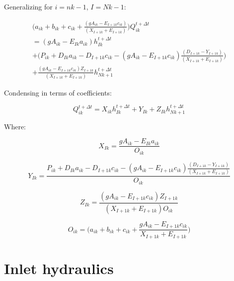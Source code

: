 \documentclass[11pt]{article}
\begin{document}
Generalizing for $i = nk - 1$, $I = Nk - 1$:

\begin{equation}
  \begin{split}
    \biggl(a_{ik} + b_{ik} + c_{ik} + \frac{( g A_{ik} - E_{I + 1k} c_{ik} )}{(X_{I + 1k} + E_{I + 1k})} \biggr)  Q_{ik}^{t + \Delta t} \\ = ( g A_{ik} - E_{Ik} a_{ik}) h_{Ik}^{t + \Delta t} \\ + \biggl( P_{ik} + D_{Ik} a_{ik}   - D_{I + 1k} c_{ik} - ( g A_{ik} - E_{I + 1k} c_{ik} ) \frac{( D_{I + 1k} - Y_{I + 1k})}{(X_{I + 1k} + E_{I + 1k})} \biggr) \\ + \frac{( g A_{ik} - E_{I + 1k} c_{ik} ) Z_{I + 1k}}{(X_{I + 1k} + E_{I + 1k})} h_{Nk + 1}^{t + \Delta t}
  \end{split}
\end{equation}

Condensing in terms of coefficients:

\begin{equation}
  \boxed{
 Q_{ik}^{t + \Delta t} = X_{ik} h_{Ik}^{t + \Delta t} + Y_{Ik} + Z_{Ik} h_{Nk + 1}^{t + \Delta t} 
 }
\end{equation}

Where:

\begin{equation}
  \boxed{
    X_{Ik} = \frac{ g A_{ik} - E_{Ik} a_{ik}}{O_{ik}}
 }
\end{equation}

\begin{equation}
  \boxed{
    Y_{Ik} = \frac{P_{ik} + D_{Ik} a_{ik}   - D_{I + 1k} c_{ik} - ( g A_{ik} - E_{I + 1k} c_{ik} ) \frac{( D_{I + 1k} - Y_{I + 1k})}{(X_{I + 1k} + E_{I + 1k})}}{O_{ik}}
 }
\end{equation}

\begin{equation}
  \boxed{
    Z_{Ik} = \frac{( g A_{ik} - E_{I + 1k} c_{ik} ) Z_{I + 1k}}{(X_{I + 1k} + E_{I + 1k}) O_{ik}}
 }
\end{equation}

\begin{equation}
  \boxed{
 O_{ik} = \biggl(a_{ik} + b_{ik} + c_{ik} + \frac{ g A_{ik} - E_{I + 1k} c_{ik} }{X_{I + 1k} + E_{I + 1k}} \biggr) 
 }
\end{equation}

\clearpage

\section{Inlet hydraulics}
\end{document}
